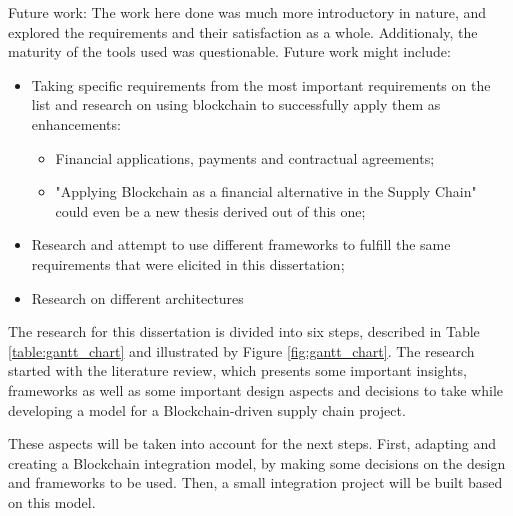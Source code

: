 Future work: The work here done was much more introductory in nature, and explored the requirements and their satisfaction as a whole. Additionaly, the maturity of the tools used was questionable. 
Future work might include:
\begin{itemize}
	\item Taking specific requirements from the most important requirements on the list and research on using blockchain to successfully apply them as enhancements:
	\begin{itemize}
		\item Financial applications, payments and contractual agreements;
		\item "Applying Blockchain as a financial alternative in the Supply Chain" could even be a new thesis derived out of this one;
	\end{itemize}
	\item Research and attempt to use different frameworks to fulfill the same requirements that were elicited in this dissertation;
    \item Research on different architectures
\end{itemize} 


The research for this dissertation is divided into six steps, described in Table \ref{table:gantt_chart} and illustrated by Figure \ref{fig:gantt_chart}. The research started with the literature review, which presents some important insights, frameworks as well as some important design aspects and decisions to take while developing a model for a Blockchain-driven supply chain project.

These aspects will be taken into account for the next steps. First, adapting and creating a Blockchain integration model, by making some decisions on the design and frameworks to be used. Then, a small integration project will be built based on this model.

